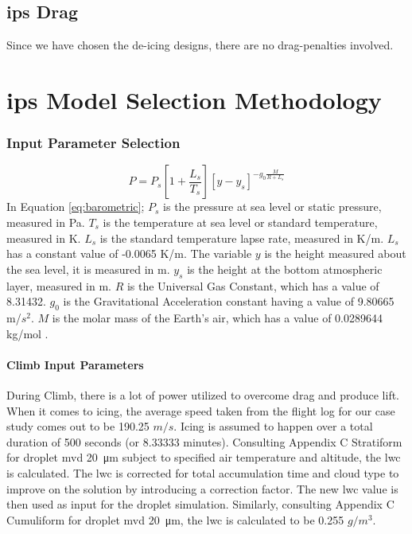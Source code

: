 \documentclass[english]{kththesis}
\begin{document}
\section{\acrshort{ips} Drag}
\label{sec:ipsdrag}
Since we have chosen the de-icing designs, there are no drag-penalties involved.

\cleardoublepage
\chapter{\acrshort{ips} Model Selection Methodology}
\label{ch:IPSparasim}
\subsection{Input Parameter Selection}
\label{subsec:inputpara}
\begin{equation}
\label{eq:barometric}
P=P_{s}\left[ 1+\frac{L_{s}}{T_{s}} \right] \left[ y-y_{s}\right]^{-g_{0}\frac{M}{R+L_{s}} }
\end{equation}
In Equation \ref{eq:barometric};  $P_s$ is the pressure at sea level or static pressure, measured in Pa. $T_s$ is the temperature at sea level or standard temperature, measured in K. $L_s$ is the standard temperature lapse rate, measured in K/m. $L_s$ has a constant value of -0.0065 K/m. The variable $y$ is the height measured about the sea level, it is measured in m. $y_s$ is the height at the bottom atmospheric layer, measured in m. $R$ is the Universal Gas Constant, which has a value of 8.31432. $g_0$ is the Gravitational Acceleration constant having a value of 9.80665 m/$s^2$. $M$ is the molar mass of the Earth's air, which has a value of 0.0289644 kg/mol \cite{presscalc}.

\subsubsection{Climb Input Parameters}
During Climb, there is a lot of power utilized to overcome drag and produce lift. When it comes to icing, the average speed taken from the flight log for our case study comes out to be 190.25 $m/s$. Icing is assumed to happen over a total duration of 500 seconds (or 8.33333 minutes). Consulting Appendix C Stratiform for droplet \acrshort{mvd} \SI{20}{\micro\metre} subject to specified air temperature and altitude, the \acrshort{lwc} is calculated. The \acrshort{lwc} is corrected for total accumulation time and cloud type to improve on the solution by introducing a correction factor. The new \acrshort{lwc} value is then used as input for the droplet simulation. Similarly, consulting Appendix C Cumuliform for droplet \acrshort{mvd} \SI{20}{\micro\metre}, the \acrshort{lwc} is calculated to be 0.255 $g/m^3$.
\end{document}
